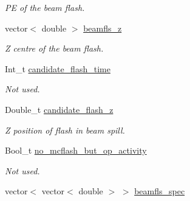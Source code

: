 \begin{DoxyCompactItemize}
\begin{DoxyCompactList}\small\item\em P\-E of the beam flash. \end{DoxyCompactList}\item 
\hypertarget{classUBXSecEvent_ac30df357368262d7a103ae9cd0bbd0d3}{vector$<$ double $>$ \hyperlink{classUBXSecEvent_ac30df357368262d7a103ae9cd0bbd0d3}{beamfls\-\_\-z}}\label{classUBXSecEvent_ac30df357368262d7a103ae9cd0bbd0d3}

\begin{DoxyCompactList}\small\item\em Z centre of the beam flash. \end{DoxyCompactList}\item 
\hypertarget{classUBXSecEvent_a84ab9cf932fabd0e1d9762ac07c75407}{Int\-\_\-t \hyperlink{classUBXSecEvent_a84ab9cf932fabd0e1d9762ac07c75407}{candidate\-\_\-flash\-\_\-time}}\label{classUBXSecEvent_a84ab9cf932fabd0e1d9762ac07c75407}

\begin{DoxyCompactList}\small\item\em Not used. \end{DoxyCompactList}\item 
\hypertarget{classUBXSecEvent_af5f3d50c4b146e63f9cf72d15ec1a958}{Double\-\_\-t \hyperlink{classUBXSecEvent_af5f3d50c4b146e63f9cf72d15ec1a958}{candidate\-\_\-flash\-\_\-z}}\label{classUBXSecEvent_af5f3d50c4b146e63f9cf72d15ec1a958}

\begin{DoxyCompactList}\small\item\em Z position of flash in beam spill. \end{DoxyCompactList}\item 
\hypertarget{classUBXSecEvent_a04fd3fd872cbe4f19ea0c438214ee854}{Bool\-\_\-t \hyperlink{classUBXSecEvent_a04fd3fd872cbe4f19ea0c438214ee854}{no\-\_\-mcflash\-\_\-but\-\_\-op\-\_\-activity}}\label{classUBXSecEvent_a04fd3fd872cbe4f19ea0c438214ee854}

\begin{DoxyCompactList}\small\item\em Not used. \end{DoxyCompactList}\item 
\hypertarget{classUBXSecEvent_a672e817e5a574c0a1ff50ec81862bc1f}{vector$<$ vector$<$ double $>$ $>$ \hyperlink{classUBXSecEvent_a672e817e5a574c0a1ff50ec81862bc1f}{beamfls\-\_\-spec}}\label{classUBXSecEvent_a672e817e5a574c0a1ff50ec81862bc1f}


\end{DoxyCompactItemize}
